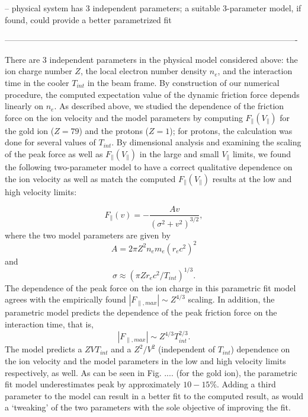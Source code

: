 \documentclass[12pt, reqno]{amsart}
\begin{document}
-- physical system has 3 independent parameters; a suitable 3-parameter model, if found, could provide a better parametrized fit  

---------------------------------------------------------------------------------------------------------- 

There are 3 independent parameters in the physical model considered above: the ion charge number $Z$, the local electron number density $n_e$, and the interaction time in the cooler $T_{int}$ in the beam frame.  By construction of our numerical procedure, the computed expectation value of the dynamic friction force depends linearly on $n_e$.  As described above, we studied the dependence of the friction force on the ion velocity and the model parameters by computing $F_{\parallel}(V_{\parallel})$ for the gold ion ($Z = 79$) and the protons ($Z = 1$); for protons, the calculation was done for several values of $T_{int}$.  By dimensional analysis and examining the scaling of the peak force as well as $F_{\parallel}(V_{\parallel})$ in the large and small $V_{\parallel}$ limits, we found the following two-parameter model to have a correct qualitative dependence on the ion velocity as well as match the computed $F_{\parallel}(V_{\parallel})$ results at the low and high velocity limits:


\begin{equation}
F_{\parallel}(v) = - \frac{A v}{(\sigma^2 + v^2)^{3/2}} ,
\end{equation}
where the two model parameters are given by 
\begin{equation*}
A = 2 \pi Z^2 n_e m_e (r_e c^2)^2 
\end{equation*}
and
\begin{equation*}
\sigma \approx (\pi Z r_e c^2 / T_{int})^{1/3} .
\end{equation*}
The dependence of the peak force on the ion charge in this parametric fit model agrees with the empirically found $|F_{\parallel,max}| \sim Z^{4/3}$ scaling. In addition, the parametric model predicts the dependence of the peak friction force on the interaction time, that is,
\begin{equation}
|F_{\parallel,max}| \sim Z^{4/3} T_{int}^{2/3}.
\end{equation}
The model predicts a $Z V T_{int}$ and a $Z^2 / V^2$ (independent of $T_{int}$) dependence on the ion velocity and the model parameters in the low and high velocity limits respectively, as well.  As can be seen in Fig. .... (for the gold ion), the parametric fit model underestimates peak by approximately $10-15\%$.  Adding a third parameter to the model can result in a better fit to the computed result, as would a `tweaking' of the two parameters with the sole objective of improving the fit.
\end{document}
